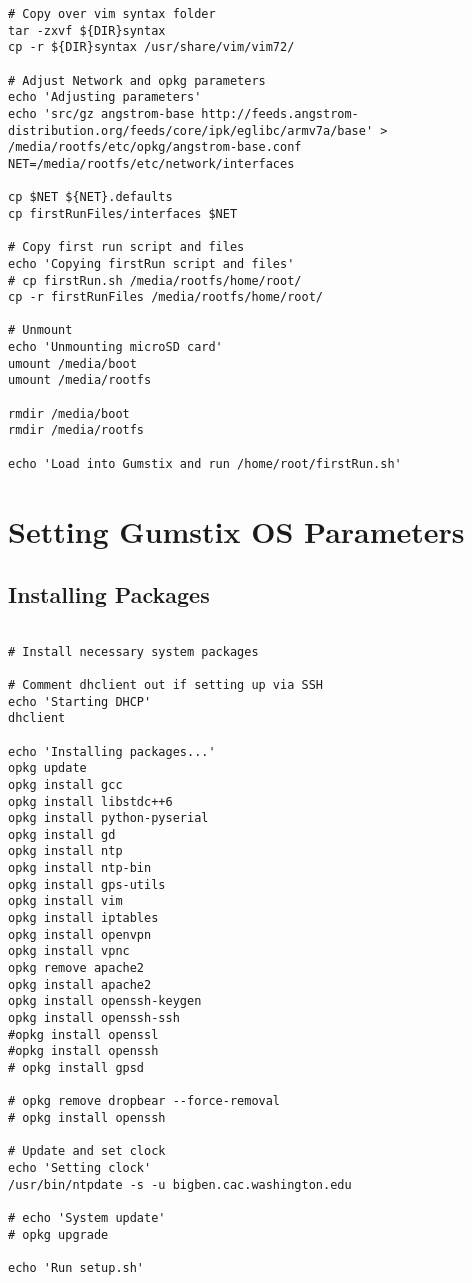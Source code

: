 \begin{verbatim}
# Copy over vim syntax folder
tar -zxvf ${DIR}syntax
cp -r ${DIR}syntax /usr/share/vim/vim72/ 

# Adjust Network and opkg parameters
echo 'Adjusting parameters'
echo 'src/gz angstrom-base http://feeds.angstrom-distribution.org/feeds/core/ipk/eglibc/armv7a/base' > /media/rootfs/etc/opkg/angstrom-base.conf
NET=/media/rootfs/etc/network/interfaces

cp $NET ${NET}.defaults
cp firstRunFiles/interfaces $NET

# Copy first run script and files
echo 'Copying firstRun script and files'
# cp firstRun.sh /media/rootfs/home/root/
cp -r firstRunFiles /media/rootfs/home/root/

# Unmount
echo 'Unmounting microSD card'
umount /media/boot
umount /media/rootfs

rmdir /media/boot
rmdir /media/rootfs

echo 'Load into Gumstix and run /home/root/firstRun.sh'
\end{verbatim}


\section{Setting Gumstix OS Parameters}

\subsection{Installing Packages}

\begin{verbatim}

# Install necessary system packages

# Comment dhclient out if setting up via SSH
echo 'Starting DHCP'
dhclient

echo 'Installing packages...'
opkg update
opkg install gcc
opkg install libstdc++6
opkg install python-pyserial
opkg install gd
opkg install ntp
opkg install ntp-bin
opkg install gps-utils
opkg install vim
opkg install iptables
opkg install openvpn
opkg install vpnc
opkg remove apache2
opkg install apache2
opkg install openssh-keygen
opkg install openssh-ssh
#opkg install openssl
#opkg install openssh
# opkg install gpsd

# opkg remove dropbear --force-removal
# opkg install openssh

# Update and set clock
echo 'Setting clock'
/usr/bin/ntpdate -s -u bigben.cac.washington.edu

# echo 'System update'
# opkg upgrade

echo 'Run setup.sh'

\end{verbatim}

